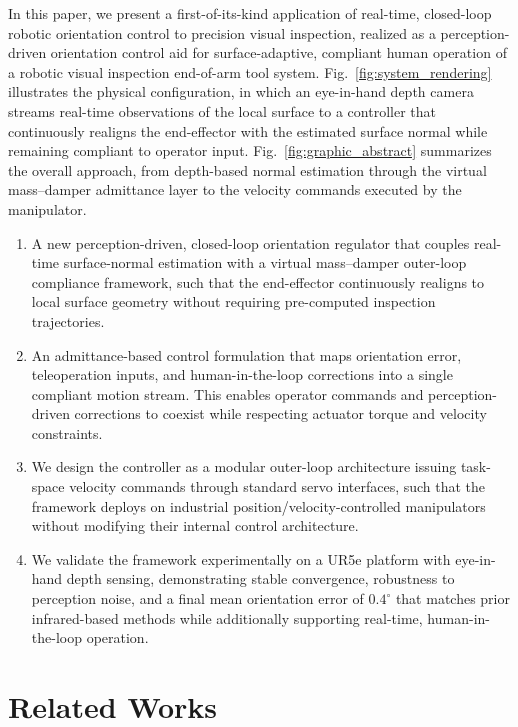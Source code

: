 \documentclass[journal]{IEEEtran}
\begin{document}
In this paper, we present a first-of-its-kind application of real-time, closed-loop robotic orientation control to precision visual inspection, realized as a perception-driven orientation control aid for surface-adaptive, compliant human operation of a robotic visual inspection end-of-arm tool system. Fig.~\ref{fig:system_rendering} illustrates the physical configuration, in which an eye-in-hand depth camera streams real-time observations of the local surface to a controller that continuously realigns the end-effector with the estimated surface normal while remaining compliant to operator input. Fig.~\ref{fig:graphic_abstract} summarizes the overall approach, from depth-based normal estimation through the virtual mass--damper admittance layer to the velocity commands executed by the manipulator.
\begin{enumerate}
\item A new perception-driven, closed-loop orientation regulator that couples real-time surface-normal estimation with a virtual mass--damper outer-loop compliance framework, such that the end-effector continuously realigns to local surface geometry without requiring pre-computed inspection trajectories.
\item An admittance-based control formulation that maps orientation error, teleoperation inputs, and human-in-the-loop corrections into a single compliant motion stream. This enables operator commands and perception-driven corrections to coexist while respecting actuator torque and velocity constraints.
\item We design the controller as a modular outer-loop architecture issuing task-space velocity commands through standard servo interfaces, such that the framework deploys on industrial position/velocity-controlled manipulators without modifying their internal control architecture.
\item We validate the framework experimentally on a UR5e platform with eye-in-hand depth sensing, demonstrating stable convergence, robustness to perception noise, and a final mean orientation error of $0.4^\circ$ that matches prior infrared-based methods while additionally supporting real-time, human-in-the-loop operation.
\end{enumerate}



\section{Related Works}
\label{sec:related}
\end{document}
